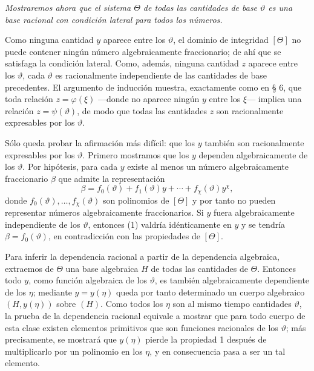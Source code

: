 \documentclass[11pt]{article}
\begin{document}
\emph{Mostraremos ahora que el sistema $\Theta$ de todas las cantidades de base $\vartheta$ es una base racional con condición lateral para todos los números.}

Como ninguna cantidad $y$ aparece entre los $\vartheta$, el dominio de integridad $[\Theta]$ no puede contener ningún número algebraicamente fraccionario; de ahí que se satisfaga la condición lateral. Como, además, ninguna cantidad $z$ aparece entre los $\vartheta$, cada $\vartheta$ es racionalmente independiente de las cantidades de base precedentes. El argumento de inducción muestra, exactamente como en § 6, que toda relación $z=\varphi(\xi)$ ---donde no aparece ningún $y$ entre los $\xi$--- implica una relación $z=\psi(\vartheta)$, de modo que todas las cantidades $z$ son racionalmente expresables por los $\vartheta$.

Sólo queda probar la afirmación más difícil: que los $y$ también son racionalmente expresables por los $\vartheta$. Primero mostramos que los $y$ dependen algebraicamente de los $\vartheta$. Por hipótesis, para cada $y$ existe al menos un número algebraicamente fraccionario $\beta$ que admite la representación
\begin{equation}
\beta=f_0(\vartheta)+f_1(\vartheta)y+\cdots+f_\chi(\vartheta)y^\chi,
\tag{1}
\end{equation}
donde $f_0(\vartheta),\ldots,f_\chi(\vartheta)$ son polinomios de $[\Theta]$ y por tanto no pueden representar números algebraicamente fraccionarios. Si $y$ fuera algebraicamente independiente de los $\vartheta$, entonces (1) valdría idénticamente en $y$ y se tendría $\beta=f_0(\vartheta)$, en contradicción con las propiedades de $[\Theta]$.

Para inferir la dependencia racional a partir de la dependencia algebraica, extraemos de $\Theta$ una base algebraica $H$ de todas las cantidades de $\Theta$. Entonces todo $y$, como función algebraica de los $\vartheta$, es también algebraicamente dependiente de los $\eta$; mediante $y=y(\eta)$ queda por tanto determinado un cuerpo algebraico $(H,y(\eta))$ sobre $(H)$. Como todos los $\eta$ son al mismo tiempo cantidades $\vartheta$, la prueba de la dependencia racional equivale a mostrar que para todo cuerpo de esta clase existen elementos primitivos que son funciones racionales de los $\vartheta$; más precisamente, se mostrará que $y(\eta)$ pierde la propiedad 1 después de multiplicarlo por un polinomio en los $\eta$, y en consecuencia pasa a ser un tal elemento.
\end{document}
